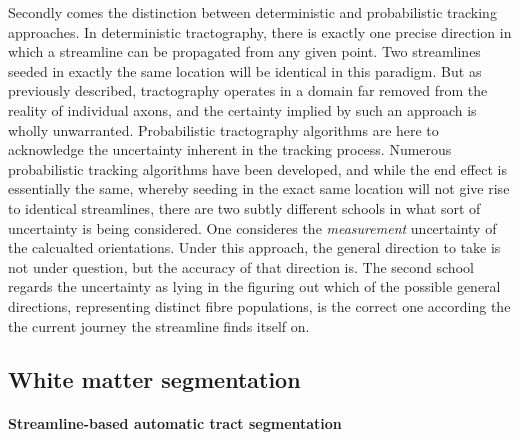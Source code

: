 Secondly comes the distinction between deterministic and probabilistic tracking approaches.
In deterministic tractography, there is exactly one precise direction in which a streamline can be propagated from any given point.
Two streamlines seeded in exactly the same location will be identical in this paradigm.
But as previously described, tractography operates in a domain far removed from the reality of individual axons, and the certainty implied by such an  approach is wholly unwarranted.
Probabilistic tractography algorithms are here to acknowledge the uncertainty inherent in the tracking process.
Numerous probabilistic tracking algorithms have been developed, and while the end effect is essentially the same, whereby seeding in the exact same location will not give rise to identical streamlines, there are two subtly different schools in what sort of uncertainty is being considered.
One consideres the \textit{measurement} uncertainty of the calcualted orientations.
Under this approach, the general direction to take is not under question, but the accuracy of that direction is.
The second school regards the uncertainty as lying in the figuring out which of the possible general directions, representing distinct fibre populations, is the correct one according the the current journey the streamline finds itself on. 

\subsection{White matter segmentation}


\paragraph*{Streamline-based automatic tract segmentation}

